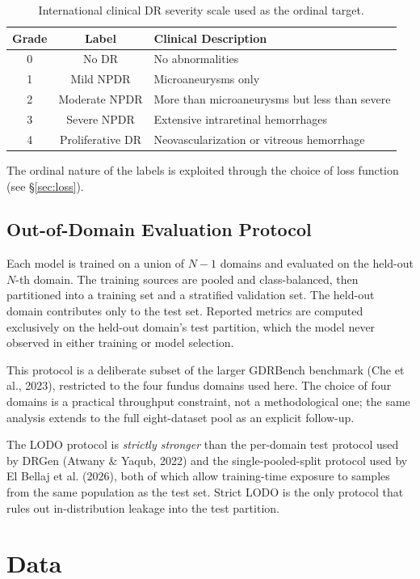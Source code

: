 \documentclass[11pt]{article}
\begin{document}
\begin{table}[ht]
\centering
\begin{tabular}{ccl}
\toprule
Grade & Label & Clinical Description \\
\midrule
0 & No DR & No abnormalities \\
1 & Mild NPDR & Microaneurysms only \\
2 & Moderate NPDR & More than microaneurysms but less than severe \\
3 & Severe NPDR & Extensive intraretinal hemorrhages \\
4 & Proliferative DR & Neovascularization or vitreous hemorrhage \\
\bottomrule
\end{tabular}
\caption{International clinical DR severity scale used as the ordinal target.}
\end{table}

The ordinal nature of the labels is exploited through the choice of loss function (see \S\ref{sec:loss}).

\subsection{Out-of-Domain Evaluation Protocol}
Each model is trained on a union of $N-1$ domains and evaluated on the held-out $N$-th domain. The training sources are pooled and class-balanced, then partitioned into a training set and a stratified validation set. The held-out domain contributes only to the test set. Reported metrics are computed exclusively on the held-out domain's test partition, which the model never observed in either training or model selection.

This protocol is a deliberate subset of the larger GDRBench benchmark (Che et al., 2023), restricted to the four fundus domains used here. The choice of four domains is a practical throughput constraint, not a methodological one; the same analysis extends to the full eight-dataset pool as an explicit follow-up.

The LODO protocol is \emph{strictly stronger} than the per-domain test protocol used by DRGen (Atwany \& Yaqub, 2022) and the single-pooled-split protocol used by El Bellaj et al. (2026), both of which allow training-time exposure to samples from the same population as the test set. Strict LODO is the only protocol that rules out in-distribution leakage into the test partition.

\section{Data}
\end{document}
